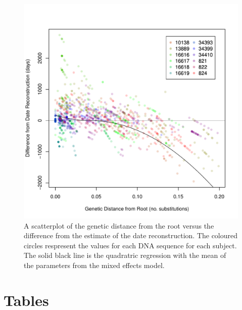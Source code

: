 \documentclass[12pt]{article}
\begin{document}
\begin{figure}[ht]
	\centering
	\includegraphics[width=\textwidth]{figures/GLM_plot.pdf}
	\caption[Regression]{A scatterplot of the genetic distance from the root versus the difference from the estimate of the date reconstruction.
	The coloured circles respresent the values for each DNA sequence for each subject. 
	The solid black line is the quadratric regression with the mean of the parameters from the mixed effects model.  %
	}
	\label{fig:glm}
\end{figure}



\clearpage


\section * {Tables}
\end{document}
